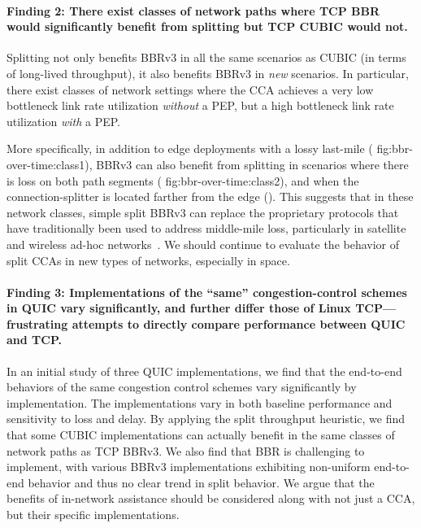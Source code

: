 \paragraph{Finding 2: There exist classes of network paths where TCP BBR would
 significantly benefit from splitting but TCP CUBIC would not.}

Splitting not only benefits BBRv3 in all the same scenarios as CUBIC (in terms
of long-lived throughput), it also benefits BBRv3 in \textit{new} scenarios. In
particular, there exist classes of network settings where the CCA achieves a
very low bottleneck link rate utilization \textit{without} a PEP, but a high
bottleneck link rate utilization \textit{with} a PEP.

More specifically, in addition to edge deployments with a lossy last-mile (\Cref
{fig:bbr-over-time:class1}), BBRv3 can also benefit from splitting in
scenarios where there is loss on both path segments (\Cref
{fig:bbr-over-time:class2}), and when the connection-splitter is located
farther from the edge (). This suggests that in
these network classes, simple split BBRv3 can replace the
proprietary protocols that have traditionally been used to address middle-mile
loss, particularly in satellite and wireless ad-hoc networks~\cite
{cloudsplitting2010,border2020evaluating,rfc3135}. We should continue to
evaluate the behavior of split CCAs in new types of networks, especially in
space.

\paragraph{Finding 3: Implementations of the ``same'' congestion-control schemes
in QUIC vary significantly, and further differ those of Linux TCP---frustrating
attempts to directly compare performance between QUIC and TCP.}

In an initial study of three QUIC implementations, we find that the end-to-end
behaviors of the same congestion control schemes vary significantly by implementation.
The implementations vary in both baseline performance and sensitivity to loss
and delay. By applying the split throughput heuristic, we find that some
CUBIC implementations can actually benefit in the same classes of network paths
as TCP BBRv3. We also find that BBR is challenging to implement, with various
BBRv3 implementations exhibiting non-uniform end-to-end behavior and thus no
clear trend in split behavior. We argue that the benefits of in-network
assistance should be considered along with not just a CCA, but their specific
implementations. \\

